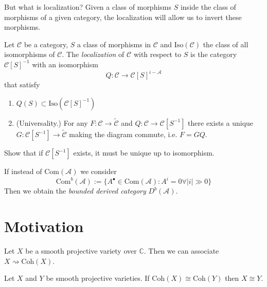 But what is localization? Given a class of morphisms $S$ inside the class of
morphisms of a given category, the localization will allow us to invert these
morphisms.

\begin{definition}
\label{definition-localization-of-category}
Let $\mathcal{C}$ be a category, $S$ a class of morphisms in
$\mathcal{C}$ and $\text{Iso}(\mathcal{C})$ the class of all isomorphisms of
$\mathcal{C}$. The {\it localization} of $\mathcal{C}$ with respect to $S$ is
the category $\mathcal{C}[S]^{-1}$ with an isomorphism 
$$
Q:\mathcal{C}\to \mathcal{C}[S]^{i-\mathcal{A}}
$$
that satisfy
\begin{enumerate}
\item $Q(S) \subset \text{Iso}(\mathcal{C}[S]^{-1})$
\item (Universality.) For any $F:\mathcal{C}\to \tilde{\mathcal{C}}$ and
$Q:\mathcal{C}\to \mathcal{C}[S^{-1}]$ there exists a unique
$G:\mathcal{C}[S^{-1}]\to \tilde{ \mathcal{C}}$ making the diagram commute, i.e.
$F=GQ$.
\end{enumerate}
\end{definition}

\begin{exercise}
\label{exercise-uniqueness-of-localization}
Show that if $\mathcal{C}[S^{-1}]$ exists, it must be unique up to isomorphism.
\end{exercise}

\begin{definition}
\label{definition-bounded-derived-category}
If instead of $\text{Com}(\mathcal{A})$ we consider
$$
\text{Com}^b(\mathcal{A}):=\{A^{\bullet} \in \text{Com}(\mathcal{A}):
A^i=0\forall  |i|\gg 0\}
$$
Then we obtain the {\it bounded derived category} $D^b(\mathcal{A})$.
\end{definition}

\section{Motivation}
\label{subsection-motivation}

Let $X$ be a smooth projective variety over $\mathbb{C}$. Then
we can associate $X\rightsquigarrow \text{Coh}(X)$.

\begin{theorem}[Gabriel]
\label{theorem-Gabriel}
Let $X$ and $Y$ be smooth projective varieties. If $\text{Coh}(X)\cong
\text{Coh}(Y)$ then $X\cong Y$.
\end{theorem}

